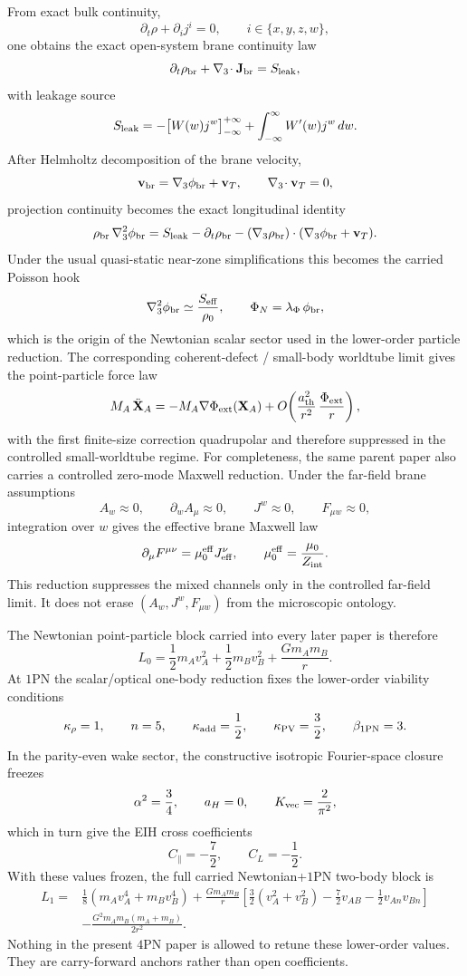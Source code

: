 \documentclass[11pt]{article}
\begin{document}
From exact bulk continuity,
\[
\partial_t\rho+\partial_i j^i=0,
\qquad i\in\{x,y,z,w\},
\]
one obtains the exact open-system brane continuity law
\[
\partial_t\rho_{\rm br}+\nabla_3\!\cdot\mathbf J_{\rm br}=S_{\rm leak},
\]
with leakage source
\[
S_{\rm leak}
=
-\bigl[W(w)j^w\bigr]_{-\infty}^{+\infty}
+
\int_{-\infty}^{\infty} W'(w)j^w\,dw.
\]
After Helmholtz decomposition of the brane velocity,
\[
\mathbf v_{\rm br}=\nabla_3\phi_{\rm br}+\mathbf v_T,
\qquad
\nabla_3\!\cdot\mathbf v_T=0,
\]
projection continuity becomes the exact longitudinal identity
\[
\rho_{\rm br}\,\nabla_3^2\phi_{\rm br}
=
S_{\rm leak}
-\partial_t\rho_{\rm br}
-(\nabla_3\rho_{\rm br})\cdot(\nabla_3\phi_{\rm br}+\mathbf v_T).
\]
Under the usual quasi-static near-zone simplifications this becomes the carried
 Poisson hook
\[
\nabla_3^2\phi_{\rm br}\simeq \frac{S_{\rm eff}}{\rho_0},
\qquad
\Phi_N=\lambda_\Phi\,\phi_{\rm br},
\]
which is the origin of the Newtonian scalar sector used in the lower-order
 particle reduction.  The corresponding coherent-defect / small-body worldtube
 limit gives the point-particle force law
\[
M_A\,\ddot{\mathbf X}_A
=
-M_A\nabla\Phi_{\rm ext}(\mathbf X_A)
+O\!\left(\frac{a_{\rm th}^2}{r^2}\,\frac{\Phi_{\rm ext}}{r}\right),
\]
with the first finite-size correction quadrupolar and therefore suppressed in
 the controlled small-worldtube regime.  For completeness, the same parent paper
 also carries a controlled zero-mode Maxwell reduction.  Under the far-field
 brane assumptions
\[
A_w\approx 0,
\qquad
\partial_w A_\mu\approx 0,
\qquad
J^w\approx 0,
\qquad
F_{\mu w}\approx 0,
\]
integration over $w$ gives the effective brane Maxwell law
\[
\partial_\mu F^{\mu\nu}=\mu_0^{\rm eff}J_{\rm eff}^\nu,
\qquad
\mu_0^{\rm eff}=\frac{\mu_0}{Z_{\rm int}}.
\]
This reduction suppresses the mixed channels only in the controlled far-field
 limit.  It does not erase $(A_w,J^w,F_{\mu w})$ from the microscopic ontology.

The Newtonian point-particle block carried into every later paper is therefore
\[
L_0
=
\frac12 m_A v_A^2
+\frac12 m_B v_B^2
+\frac{Gm_A m_B}{r}.
\]
At $1$PN the scalar/optical one-body reduction fixes the lower-order viability
 conditions
\[
\kappa_\rho=1,
\qquad
n=5,
\qquad
\kappa_{\rm add}=\frac12,
\qquad
\kappa_{\rm PV}=\frac32,
\qquad
\beta_{\rm 1PN}=3.
\]
In the parity-even wake sector, the constructive isotropic Fourier-space closure
 freezes
\[
\alpha^2=\frac34,
\qquad
a_H=0,
\qquad
K_{\rm vec}=\frac{2}{\pi^2},
\]
which in turn give the EIH cross coefficients
\[
C_\parallel=-\frac72,
\qquad
C_L=-\frac12.
\]
With these values frozen, the full carried Newtonian+$1$PN two-body block is
\[
\begin{aligned}
L_1=
&\frac18(m_Av_A^4+m_Bv_B^4)
+\frac{Gm_A m_B}{r}
\left[
\frac32(v_A^2+v_B^2)
-\frac72 v_{AB}
-\frac12 v_{An}v_{Bn}
\right]
\\
&-\frac{G^2m_A m_B(m_A+m_B)}{2r^2}.
\end{aligned}
\]
Nothing in the present $4$PN paper is allowed to retune these lower-order
 values.  They are carry-forward anchors rather than open coefficients.
\end{document}

